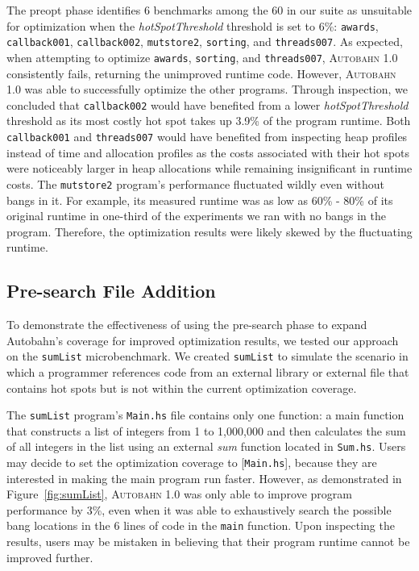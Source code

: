 \documentclass[format=sigplan, review=true, 9pt]{acmart}
\newcommand{\figref}[1]{Figure~\ref{#1}}
\newcommand{\hotspots}[0]{hot spots}
\newcommand{\hotspotcost}[0]{\textit{hotSpotThreshold}}
\newcommand{\Ao}[0]{\textsc{Autobahn 1.0}}
\newcommand{\preopt}[0]{pre-search}
\newcommand{\Preopt}[0]{Pre-search}
\newcommand{\unimp}[0]{unimproved}
\begin{document}
The preopt{} phase identifies 6 benchmarks among the 60 in our suite
as unsuitable for optimization when the \hotspotcost{}
threshold is set to 6\%:  \texttt{awards}, \texttt{callback001},
\texttt{callback002}, \texttt{mutstore2}, \texttt{sorting}, and \texttt{threads007}. As
expected, when attempting to
optimize \texttt{awards}, \texttt{sorting},
and \texttt{threads007}, \Ao{} consistently fails, returning
the \unimp{} runtime code. However, \Ao{} was able to
successfully optimize the other programs. Through inspection, we
concluded that \texttt{callback002} would have benefited from a
lower \hotspotcost{} threshold as its most costly hot spot takes up
3.9\% of the program runtime. Both \texttt{callback001}
and \texttt{threads007} would have benefited from inspecting heap
profiles instead of time and allocation profiles as the costs
associated with their hot spots were noticeably larger in heap
allocations while remaining insignificant in runtime
costs. The \texttt{mutstore2} program's performance fluctuated wildly
even without bangs in it. For example, its measured runtime was as low
as 60\% - 80\% of its original runtime in one-third of the experiments
we ran with no bangs in the program. Therefore, the optimization
results were likely skewed by the fluctuating runtime.

\subsection{\Preopt{} File Addition}
To demonstrate the effectiveness of using the \preopt{} phase to
expand Autobahn's coverage for improved optimization results, we
tested our approach on the \texttt{sumList} microbenchmark. We
created \texttt{sumList} to simulate the scenario in which a
programmer references code from an external library or external file
that contains \hotspots{} but is not within the current optimization
coverage. 

The \texttt{sumList} program's \texttt{Main.hs} file contains only one
function: a main function that constructs a list of integers from 1 to
1,000,000 and then calculates the sum of all integers in the list using an
external \textit{sum} function located in \texttt{Sum.hs}. Users
may decide to set the optimization coverage to [\texttt{Main.hs}],
because they are interested in making the main program run
faster. However, as demonstrated in \figref{fig:sumList}, \Ao{} was only able to
improve program performance by 3\%, even when it was able to
exhaustively search the possible bang locations in the 6 lines of code in the \texttt{main}
function. Upon inspecting the results, users may be mistaken in
believing that their program runtime cannot be improved
further.
\end{document}
